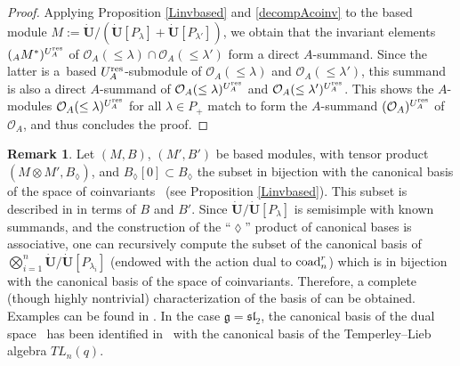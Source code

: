 \documentclass[pdftex]{sigma}
\numberwithin{equation}{section}
\theoremstyle{definition}
\newtheorem{Remark}[teo]{Remark}
\newcommand{\Oo}{{\mathcal O}}
\begin{document}
\begin{proof}
 Applying Proposition \ref{Linvbased} and \eqref{decompAcoinv} to the based module $M:=\dot{\mathbf{U}} /(\dot{\mathbf{U}} [P_\lambda]+ \dot{\mathbf{U}} [P_{\lambda'}])$, we obtain that the invariant elements $({}_A M^*)^{U_A^{\rm res}}$ of $\Oo_A(\leq \lambda) \cap \Oo_A(\leq \lambda')$ form a direct $A$-summand. Since the latter is a~based $U_A^{\rm res}$-submodule of $ \Oo_A(\leq \lambda)$ and $\Oo_A(\leq \lambda')$, this summand is also a direct $A$-summand of $ \Oo_A(\leq \lambda)^{U_A^{\rm res}}$ and $\Oo_A(\leq \lambda')^{U_A^{\rm res}}$. This shows the $A$-modules $ \Oo_A(\leq \lambda)^{U_A^{\rm res}}$ for all $\lambda\in P_+$ match to form the $A$-summand $(\Oo_A)^{U_A^{\rm res}}$ of $\Oo_A$, and thus concludes the proof.
 \end{proof}

\begin{Remark} Let $(M,B)$, $(M', B')$ be based modules, with tensor product $(M\otimes M',B_{\lozenge})$, and $B_{\lozenge}[0]\subset B_{\lozenge}$ the subset in bijection with the canonical basis of the space of coinvariants~ (see Proposition \ref{Linvbased}). This subset is described in \cite[Proposition 27.3.8]{Lusztig} in terms of $B$ and $B'$. Since $\dot{\mathbf{U}} / \dot{\mathbf{U}} [P_{\lambda}]$ is semisimple with known summands, and the construction of the ``$\lozenge$'' product of canonical bases is associative, one can recursively compute the subset of the canonical basis of $\bigotimes_{i=1}^n \dot{\mathbf{U}} / \dot{\mathbf{U}} [P_{\lambda_i}]$ (endowed with the action dual to ${\rm coad}_n^r$) which is in bijection with the canonical basis of the space of coinvariants. Therefore, a complete (though highly nontrivial) characterization of the basis of \smash{$\big(\Oo_A^{\otimes n}\big)^{U_A^{\rm res}}$} can be obtained. Examples can be found in \cite[Section~27.3.10]{Lusztig}. In the case $\mathfrak{g}={\mathfrak{sl}_2}$, the canonical basis of the dual space~ has been identified in~\cite{FK} with the canonical basis of the Temperley--Lieb algebra $TL_n(q)$.
\end{Remark}
\end{document}
